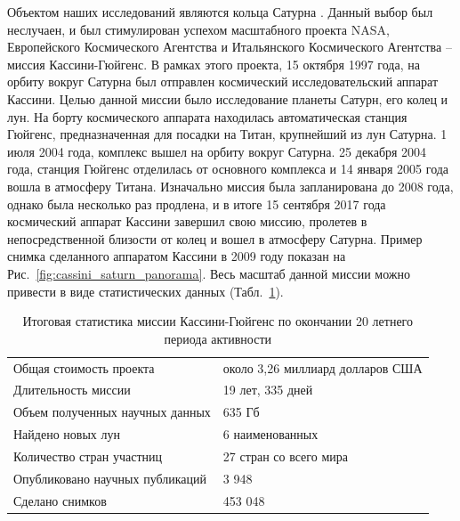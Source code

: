 Объектом наших исследований являются кольца Сатурна \cite{Cassini:2009book}. 
Данный выбор был неслучаен, и был стимулирован успехом масштабного проекта NASA, Европейского Космического Агентства и Итальянского
Космического Агентства -- миссия Кассини-Гюйгенс. В рамках этого проекта, 15 октября 1997 года, на орбиту вокруг Сатурна был отправлен космический
исследовательский аппарат Кассини. Целью данной миссии было исследование планеты Сатурн, его колец и лун. На борту космического аппарата находилась
автоматическая станция Гюйгенс, предназначенная для посадки на Титан, крупнейший из лун Сатурна. 1 июля 2004 года, комплекс вышел на орбиту вокруг 
Сатурна.
25 декабря 2004 года, станция Гюйгенс отделилась от основного комплекса и 14 января 2005 года вошла в атмосферу Титана. Изначально миссия была 
запланирована до 2008 года, однако была несколько раз продлена, и в итоге 15 сентября 2017 года космический аппарат Кассини завершил свою миссию,
пролетев в непосредственной близости от колец и вошел в атмосферу Сатурна. 
Пример снимка сделанного аппаратом Кассини в 2009 году показан на Рис.~\ref{fig:cassini_saturn_panorama}.
Весь масштаб данной миссии можно привести в виде статистических данных 
(Табл.~\ref{tab:cassini_mission}). 
\begin{table}[ht]    
    \caption{Итоговая статистика миссии Кассини-Гюйгенс по окончании 20 летнего периода активности}
    \begin{tabular}{|l|l|}
    \hline    
        Общая стоимость проекта             & около 3,26 миллиард долларов США  \\
        Длительность миссии                 & 19 лет, 335 дней                  \\
        Объем полученных научных данных     & 635 Гб                            \\
        Найдено новых лун                   & 6 наименованных                   \\
        Количество стран участниц           & 27 стран со всего мира            \\
        Опубликовано научных публикаций     & 3 948                             \\
        Сделано снимков                     & 453 048                           \\
    \hline    
    \end{tabular}
    \label{tab:cassini_mission}
\end{table}

